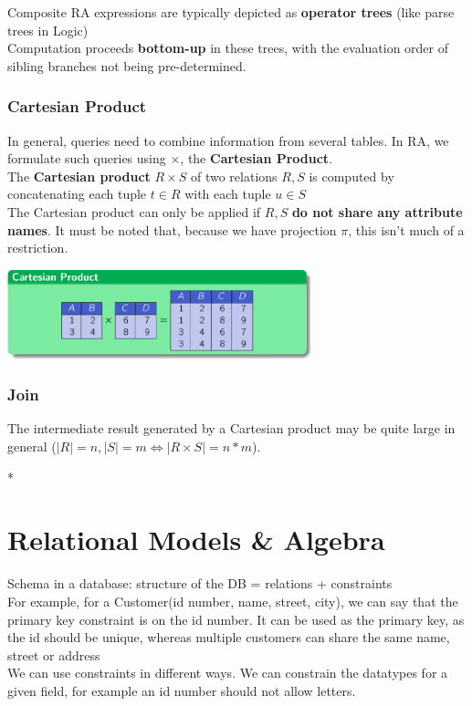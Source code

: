 \documentclass{article}
\begin{document}
Composite RA expressions are typically depicted as \textbf{operator trees} (like parse trees in Logic)
\\Computation proceeds \textbf{bottom-up} in these trees, with the evaluation order of sibling branches not being pre-determined.

\subsubsection*{Cartesian Product}
In general, queries need to combine information from several tables. In RA, we formulate such queries using $\times$, the \textbf{Cartesian Product}.
\\The \textbf{Cartesian product} $R \times S$ of two relations $R,S$ is computed by concatenating each tuple $t\in R$ with each tuple $u \in S$
\\The Cartesian product can only be applied if $R, S$ \textbf{do not share any attribute names}. It must be noted that, because we have projection $\pi$, this isn't much of a restriction.
\begin{center}
\includegraphics[width= 250pt]{tex/lecture2/cartesianproduct.png}
\end{center}

\subsubsection*{Join}
The intermediate result generated by a Cartesian product may be quite large in general ($|R|=n, |S|=m \Longleftrightarrow|R\times S| = n*m$).




























\/*
\section*{Relational Models \& Algebra}
Schema in a database: structure of the DB = relations + constraints
\\For example, for a Customer(id number, name, street, city), we can say that the primary key constraint is on the id number. It can be used as the primary key, as the id should be unique, whereas multiple customers can share the same name, street or address
\\We can use constraints in different ways. We can constrain the datatypes for a given field, for example an id number should not allow letters.  
\end{document}
